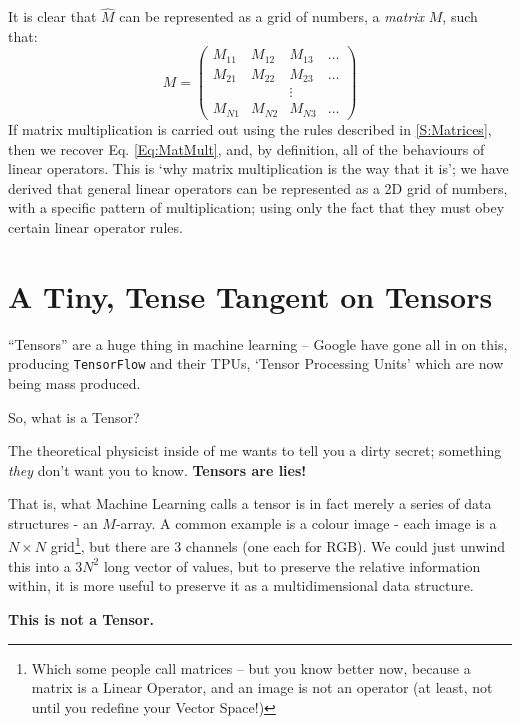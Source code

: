 \documentclass[a4paper,openany,11pt]{book}
\begin{document}
			It is clear that $\hat{M}$ can be represented as a grid of numbers, a \textit{matrix} $M$, such that:
			\begin{equation}
				M = \begin{pmatrix}
					M_{11} & M_{12} & M_{13} & \dots
					\\
					M_{21} & M_{22} & M_{23} & \dots
					\\
					& & \vdots & 
					\\
					M_{N1} & M_{N2} & M_{N3} & \dots
				\end{pmatrix}
			\end{equation}
			If matrix multiplication is carried out using the rules described in \ref{S:Matrices}, then we recover Eq. \ref{Eq:MatMult}, and, by definition, all of the behaviours of linear operators. This is `why matrix multiplication is the way that it is'; we have derived that general linear operators can be represented as a 2D grid of numbers, with a specific pattern of multiplication; using only the fact that they must obey certain linear operator rules.
		\chapter{A Tiny, Tense Tangent on Tensors}

			``Tensors'' are a huge thing in machine learning -- Google have gone all in on this, producing \verb|TensorFlow| and their TPUs, `Tensor Processing Units' which are now being mass produced.

			So, what is a Tensor?

			The theoretical physicist inside of me wants to tell you a dirty secret; something \textit{they} don't want you to know. \textbf{Tensors are lies!}


			That is, what Machine Learning calls a tensor is in fact merely a series of data structures - an $M$-array. A common example is a colour image - each image is a $N\times N$ grid\footnote{Which some people call matrices -- but you know better now, because a matrix is a Linear Operator, and an image is not an operator (at least, not until you redefine your Vector Space!)}, but there are 3 channels (one each for RGB). We could just unwind this into a $3N^2$ long vector of values, but to preserve the relative information within, it is more useful to preserve it as a multidimensional data structure.

			\textbf{This is not a Tensor.}
\end{document}
